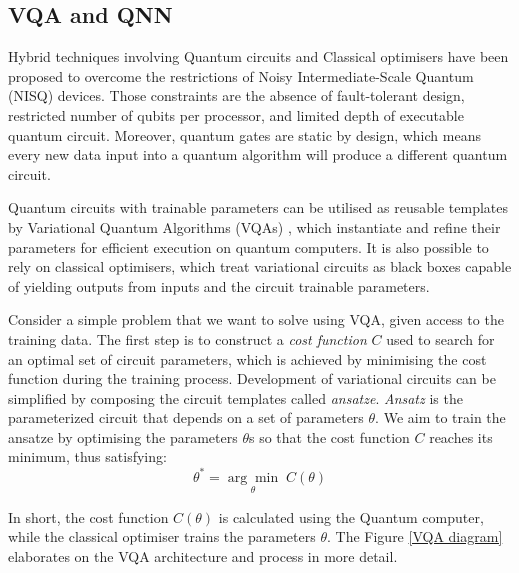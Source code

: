\subsection{VQA and QNN}

Hybrid techniques involving Quantum circuits and Classical optimisers have been proposed to overcome the restrictions of Noisy Intermediate-Scale Quantum (NISQ) \cite{brooksQuantumSupremacyHunt2019} devices. 
Those constraints are the absence of fault-tolerant design, restricted number of qubits per processor, and limited depth of executable quantum circuit. 
Moreover, quantum gates are static by design, which means every new data input into a quantum algorithm will produce a different quantum circuit.

Quantum circuits with trainable parameters can be utilised as reusable templates by Variational Quantum Algorithms (VQAs) \cite{cerezo2021variational}, which instantiate and refine their parameters for efficient execution on quantum computers.
It is also possible to rely on classical optimisers, which treat variational circuits as black boxes capable of yielding outputs from inputs and the circuit trainable parameters.

Consider a simple problem that we want to solve using VQA, given access to the training data.
The first step is to construct a \textit{cost function} $C$ used to search for an optimal set of circuit parameters, which is achieved by minimising the cost function during the training process.
Development of variational circuits can be simplified by composing the circuit templates called \textit{ansatze}. 
\textit{Ansatz} is the parameterized circuit that depends on a set of parameters $\theta$. We aim to train the ansatze by optimising the parameters $\theta$s so that the cost function $C$ reaches its minimum, thus satisfying:
\begin{equation}
    \theta^* = \underset{\theta}{\arg \min} \;C(\theta)
    \label{optimize theta with ansatz}
\end{equation}

In short, the cost function $C(\theta)$ is calculated using the Quantum computer, while the classical optimiser trains the parameters $\theta$. The Figure \ref{VQA diagram} elaborates on the VQA architecture and process in more detail.

